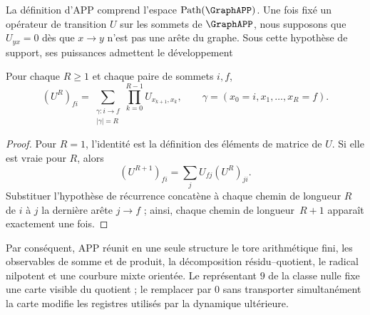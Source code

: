 La définition d'APP comprend l'espace
\(\operatorname{Path}(\GraphAPP)\). Une fois fixé un opérateur de
transition \(U\) sur les sommets de \(\GraphAPP\), nous supposons que
\(U_{yx}=0\) dès que \(x\to y\) n'est pas une arête du graphe. Sous cette
hypothèse de support, ses puissances admettent le développement
\begin{proposition}
\label{prop:app-suma-caminos}
Pour chaque \(R\ge1\) et chaque paire de sommets \(i,f\),
\[
(U^R)_{fi}
=\sum_{\substack{\gamma:i\to f\\|\gamma|=R}}
\prod_{k=0}^{R-1}U_{x_{k+1},x_k},
\qquad
\gamma=(x_0=i,x_1,\ldots,x_R=f).
\]
\end{proposition}

\begin{proof}
Pour \(R=1\), l'identité est la définition des éléments de matrice de
\(U\). Si elle est vraie pour \(R\), alors
\[
 (U^{R+1})_{fi}
 =\sum_j U_{fj}(U^R)_{ji}.
\]
Substituer l'hypothèse de récurrence concatène à chaque chemin de longueur \(R\)
de \(i\) à \(j\) la dernière arête \(j\to f\) ; ainsi, chaque chemin de
longueur~\(R+1\) apparaît exactement une fois.\qedhere
\end{proof}

Par conséquent, APP réunit en une seule structure le tore arithmétique fini,
les observables de somme et de produit, la décomposition résidu--quotient, le
radical nilpotent et une courbure mixte orientée. Le représentant \(9\) de
la classe nulle fixe une carte visible du quotient ; le remplacer par \(0\) sans
transporter simultanément la carte modifie les registres utilisés par la
dynamique ultérieure.
\fi
